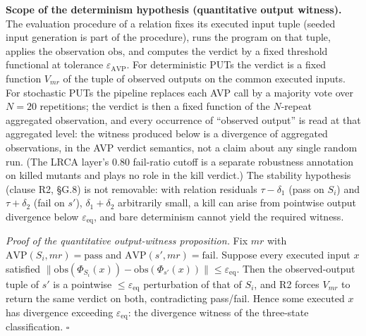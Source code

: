 \documentclass[manuscript,screen,review]{acmart}
\begin{document}
\textbf{Scope of the determinism hypothesis (quantitative output
witness).} The
evaluation procedure of a relation fixes its executed input tuple
(seeded input generation is part of the procedure), runs the program on
that tuple, applies the observation $\mathrm{obs}$, and computes the
verdict by a fixed threshold functional at tolerance
$\varepsilon_{\mathrm{AVP}}$. For deterministic PUTs the verdict is a
fixed function $V_{mr}$ of the tuple of observed outputs on the common
executed inputs. For stochastic PUTs the pipeline replaces each AVP call
by a majority vote over $N = 20$ repetitions; the verdict is then a
fixed function of the $N$-repeat aggregated observation, and every
occurrence of ``observed output'' is read at that aggregated level: the
witness produced below is a divergence of aggregated observations, in
the AVP verdict semantics, not a claim about any single random run.
(The LRCA layer's 0.80 fail-ratio cutoff is a separate robustness
annotation on killed mutants and plays no role in the kill verdict.)
The stability hypothesis (clause R2, §G.8) is not removable: with
relation residuals $\tau - \delta_1$ (pass on $S_i$) and
$\tau + \delta_2$ (fail on $s'$), $\delta_1 + \delta_2$ arbitrarily
small, a kill can arise from pointwise output divergence below
$\varepsilon_{\mathrm{eq}}$, and bare determinism cannot yield the
required witness.

\emph{Proof of the quantitative output-witness proposition.} Fix $mr$ with
$\mathrm{AVP}(S_i, mr) = \mathrm{pass}$ and
$\mathrm{AVP}(s', mr) = \mathrm{fail}$. Suppose every executed input $x$
satisfied
$\|\mathrm{obs}(\Phi_{S_i}(x)) - \mathrm{obs}(\Phi_{s'}(x))\| \leq \varepsilon_{\mathrm{eq}}$.
Then the observed-output tuple of $s'$ is a pointwise
$\leq \varepsilon_{\mathrm{eq}}$ perturbation of that of $S_i$, and R2
forces $V_{mr}$ to return the same verdict on both, contradicting
pass/fail. Hence some executed $x$ has divergence exceeding
$\varepsilon_{\mathrm{eq}}$: the divergence witness of the three-state
classification. $\square$
\end{document}
